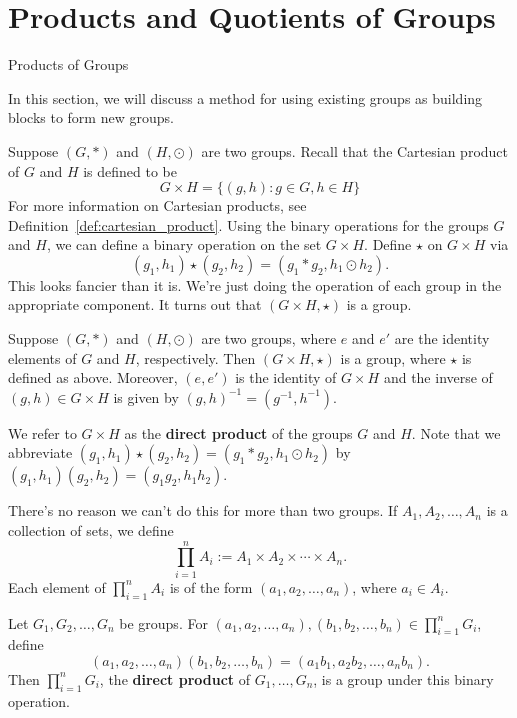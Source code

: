 \chapter{Products and Quotients of Groups}
\label{chapter:products_quotients}
\thispagestyle{empty}

\begin{section}{Products of Groups}

In this section, we will discuss a method for using existing groups as building blocks to form new groups.

Suppose $(G,*)$ and $(H,\odot)$ are two groups.  Recall that the Cartesian product of $G$ and $H$ is defined to be
\[
G\times H=\{(g,h):g\in G,h\in H\}
\]
For more information on Cartesian products, see Definition~\ref{def:cartesian_product}.  Using the binary operations for the groups $G$ and $H$, we can define a binary operation on the set $G\times H$.  Define $\star$ on $G\times H$ via
\[
(g_1,h_1)\star(g_2,h_2)=(g_1*g_2,h_1\odot h_2).
\]
This looks fancier than it is.  We're just doing the operation of each group in the appropriate component.  It turns out that $(G\times H,\star)$ is a group.

\begin{theorem}
Suppose $(G,*)$ and $(H,\odot)$ are two groups, where $e$ and $e'$ are the identity elements of $G$ and $H$, respectively.   Then $(G\times H,\star)$ is a group, where $\star$ is defined as above.  Moreover, $(e,e')$ is the identity of $G\times H$ and the inverse of $(g,h)\in G\times H$ is given by $(g,h)^{-1}=(g^{-1},h^{-1})$.
\end{theorem}

We refer to $G\times H$ as the \textbf{direct product} of the groups $G$ and $H$.  Note that we abbreviate $(g_1,h_1)\star(g_2,h_2)=(g_1*g_2,h_1\odot h_2)$ by $(g_1,h_1)(g_2,h_2)=(g_1 g_2,h_1 h_2)$.

There's no reason we can't do this for more than two groups.  If $A_1, A_2, \ldots, A_n$ is a collection of sets, we define
\[
\prod_{i=1}^nA_i:=A_1\times A_2\times \cdots \times A_n.
\]
Each element of $\prod_{i=1}^nA_i$ is of the form $(a_1,a_2,\ldots, a_n)$, where $a_i\in A_i$.

\begin{theorem}
Let $G_1, G_2,\ldots, G_n$ be groups.  For $(a_1,a_2, \ldots, a_n), (b_1,b_2,\ldots, b_n)\in \prod_{i=1}^nG_i$, define
\[
(a_1,a_2, \ldots, a_n)(b_1,b_2,\ldots, b_n)=(a_1b_1,a_2b_2,\ldots, a_nb_n).
\]
Then $\prod_{i=1}^nG_i$, the \textbf{direct product} of $G_1,\ldots, G_n$, is a group under this binary operation.
\end{theorem}


\end{section}
